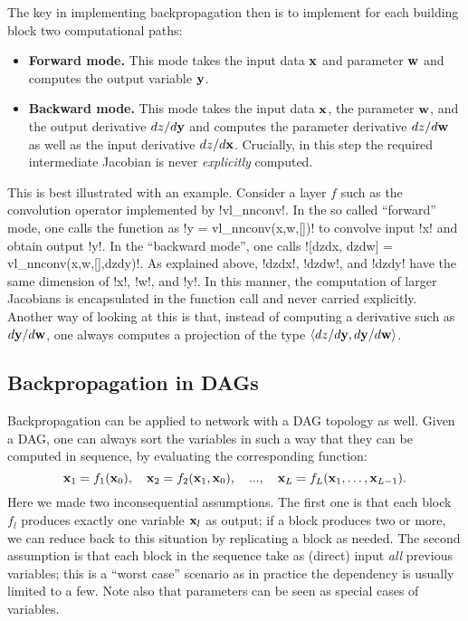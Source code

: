 The key in implementing backpropagation then is to implement for each building block two computational paths:
\begin{itemize}
	\item \textbf{Forward mode.} This mode takes the input data $\mathbf{x}$ and parameter $\mathbf{w}$ and computes the output variable $\mathbf{y}$.
	\item \textbf{Backward mode.} This mode takes the input data $\mathbf{x}$,  the parameter $\mathbf{w}$, and the output derivative $dz / d \mathbf{y}$ and computes the parameter derivative $dz / d \mathbf{w}$ as well as the input derivative $dz / d \mathbf{x}$. Crucially, in this step the required intermediate Jacobian is never \emph{explicitly} computed.
\end{itemize}
 This is best illustrated with an example. Consider a layer $f$ such as the convolution operator implemented by !vl_nnconv!. In the so called ``forward'' mode, one calls the function as !y = vl_nnconv(x,w,[])! to convolve input !x! and obtain output !y!. In the ``backward mode'', one calls ![dzdx, dzdw] = vl_nnconv(x,w,[],dzdy)!.  As explained above, !dzdx!, !dzdw!, and !dzdy! have the same dimension of !x!, !w!, and !y!. In this manner, the computation of larger Jacobians is encapsulated in the function call and never carried explicitly. Another way of looking at this is that, instead of computing a derivative such as $d\mathbf{y}/d\mathbf{w}$, one always computes a projection of the type $\langle dz/d\mathbf{y}, d\mathbf{y}/d\mathbf{w}\rangle$.

\subsection{Backpropagation in DAGs}\label{s:dag}

Backpropagation can be applied to network with a DAG topology as well. Given a DAG, one can always sort the variables in such a way that they can be computed in sequence, by evaluating the corresponding function:
\[
\mathbf{x}_1 = f_1(\mathbf{x}_0),
\quad
\mathbf{x}_2 = f_2(\mathbf{x}_1,\mathbf{x}_0),
\quad
...,
\quad
\mathbf{x}_L = f_L(\mathbf{x}_1,\dots,\mathbf{x}_{L-1}).
\]
Here we made two inconsequential assumptions. The first one is that each block $f_l$ produces exactly one variable $\mathbf{x}_l$ as output; if a block produces two or more, we can reduce back to this situation by replicating a block as needed. The second assumption is that each block in the sequence take as (direct) input \emph{all} previous variables; this is a ``worst case'' scenario as in practice the dependency is usually limited to a few. Note also that parameters can be seen as special cases of variables.

